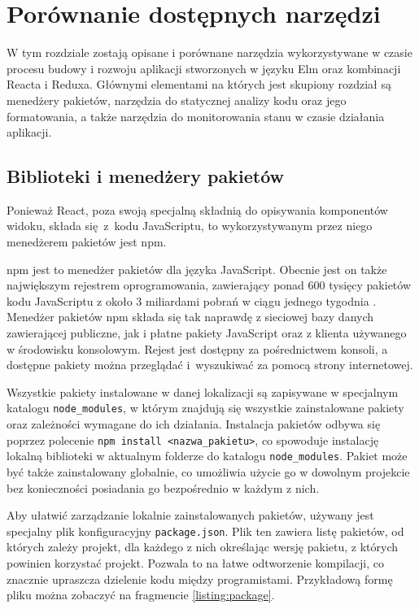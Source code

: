 \chapter{Porównanie dostępnych narzędzi}\label{chap:tools}
W tym rozdziale zostają opisane i porównane narzędzia wykorzystywane w czasie procesu budowy i rozwoju aplikacji stworzonych w języku Elm oraz kombinacji Reacta i Reduxa. Głównymi elementami na których jest skupiony rozdział są menedżery pakietów, narzędzia do statycznej analizy kodu oraz jego formatowania, a także narzędzia do monitorowania stanu w czasie działania aplikacji.

\section{Biblioteki i menedżery pakietów}
Ponieważ React, poza swoją specjalną składnią do opisywania komponentów widoku, składa się z~kodu JavaScriptu, to wykorzystywanym przez niego menedżerem pakietów jest npm. 

npm jest to menedżer pakietów dla języka JavaScript. Obecnie jest on także największym rejestrem oprogramowania, zawierający ponad 600 tysięcy pakietów kodu JavaScriptu z około 3 miliardami pobrań w ciągu jednego tygodnia \cite{whatIsNpm}. Menedżer pakietów npm składa się tak naprawdę z sieciowej bazy danych zawierającej publiczne, jak i płatne pakiety JavaScript oraz z klienta używanego w środowisku konsolowym. Rejest jest dostępny za pośrednictwem konsoli, a dostępne pakiety można przeglądać i~wyszukiwać za pomocą strony internetowej. 

Wszystkie pakiety instalowane w danej lokalizacji są zapisywane w specjalnym katalogu \lstinline{node_modules}, w którym znajdują się wszystkie zainstalowane pakiety oraz zależności wymagane do ich działania. Instalacja pakietów odbywa się poprzez polecenie \lstinline{npm install <nazwa_pakietu>}, co spowoduje instalację lokalną biblioteki w aktualnym folderze do katalogu \lstinline{node_modules}. Pakiet może być także zainstalowany globalnie, co umożliwia użycie go w dowolnym projekcie bez konieczności posiadania go bezpośrednio w każdym z nich.

Aby ułatwić zarządzanie lokalnie zainstalowanych pakietów, używany jest specjalny plik konfiguracyjny \lstinline{package.json}. Plik ten zawiera listę pakietów, od których zależy projekt, dla każdego z nich określając wersję pakietu, z których powinien korzystać projekt. Pozwala to na łatwe odtworzenie kompilacji, co znacznie upraszcza dzielenie kodu między programistami. Przykładową formę pliku można zobaczyć na fragmencie \ref{listing:package}.

